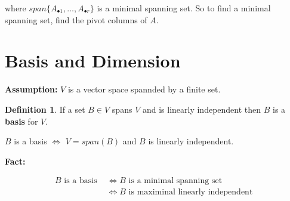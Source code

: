 \documentclass[12pt]{article}
\theoremstyle{definition}
\newtheorem*{definition}{Definition}
\begin{document}
where $span\{A_{\bullet 1}, \ldots, A_{\bullet r} \}$ is a minimal spanning set. So to
find a minimal spanning set, find the pivot columns of $A$.

\section{Basis and Dimension}

\noindent \textbf{Assumption:} $V$ is a vector space spannded by a finite set.

\begin{definition}
If a set $B \in V$ spans $V$ and is linearly independent then $B$ is a \textbf{basis} for $V$.
\end{definition}

$B$ is a basis $\iff$ $V = span(B)$ and $B$ is linearly independent.

\vspace{0.5cm}

\noindent \textbf{Fact:} 

\begin{align*}
B \text{ is a basis } &\iff B \text{ is a minimal spanning set } \\
&\iff B \text{ is maximinal linearly independent } 
\end{align*}
\end{document}

